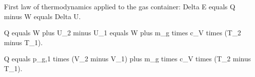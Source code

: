 First law of thermodynamics applied to the gas container:  
Delta E equals Q minus W equals Delta U.  

Q equals W plus U_2 minus U_1 equals W plus m_g times c_V times (T_2 minus T_1).  

Q equals p_g,1 times (V_2 minus V_1) plus m_g times c_V times (T_2 minus T_1).